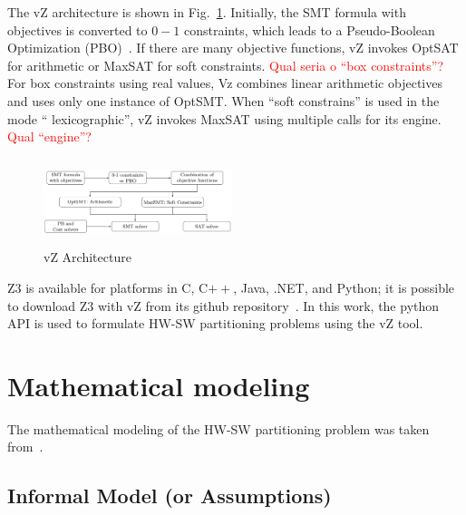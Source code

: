 The vZ architecture is shown in Fig.~\ref{vZ-Architecture}. Initially, the SMT formula with objectives is converted to $0-1$ constraints, which leads to a Pseudo-Boolean Optimization (PBO)~\cite{Barth1995,Vasco2005}. If there are many objective functions, vZ invokes OptSAT for arithmetic or MaxSAT for soft constraints. \textcolor{red}{Qual seria o ``box constraints''?} For box constraints using real values, Vz combines linear arithmetic objectives and uses only one instance of OptSMT. When ``soft constrains'' is used in the mode `` lexicographic'', vZ invokes MaxSAT using multiple calls for its engine. \textcolor{red}{Qual ``engine''?} 
%
\begin{figure}[ht]
	\centering
  \includegraphics[width=0.49\textwidth, height=95px]{Image/vzArch.png} 
	\caption{vZ Architecture~\cite{Bjorner2015}}
	\label{vZ-Architecture}
\end{figure}

Z3 is available for platforms in C, C$++$, Java, .NET, and Python; it is possible to download Z3 with vZ from its github repository~\cite{Z3API}. In this work, the python API is used to formulate HW-SW partitioning problems using the vZ tool. 

\section{Mathematical modeling}
\label{Mathematical-modeling}

The mathematical modeling of the HW-SW partitioning problem was taken from~\cite{Arato2003,Mann2007}.

\subsection{Informal Model (or Assumptions)}
\label{Informal-Model-or-Assumptions}

